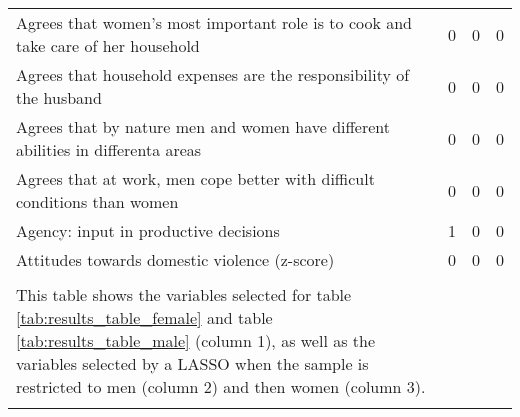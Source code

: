 \begin{longtable}{m{9cm}ccc}
Agrees that women’s most important role is to cook and take care of her household &0&0&0\\
Agrees that household expenses are the responsibility of the husband&0&0&0\\
Agrees that by nature men and women have different abilities in differenta areas&0&0&0\\
Agrees that at work, men cope better with difficult conditions than women&0&0&0\\
Agency: input in productive decisions&1&0&0\\
Attitudes towards domestic violence (z-score)&0&0&0\\
\midrule
\begin{minipage}{13cm}
\small{
{\textit Notes:} \\
This table shows the variables selected for table \ref{tab:results_table_female} and table \ref{tab:results_table_male} (column 1), as well as the variables selected by a LASSO when the sample is restricted to men (column 2) and then women (column 3). \\
}
\end{minipage} \\* \bottomrule
\end{longtable}
